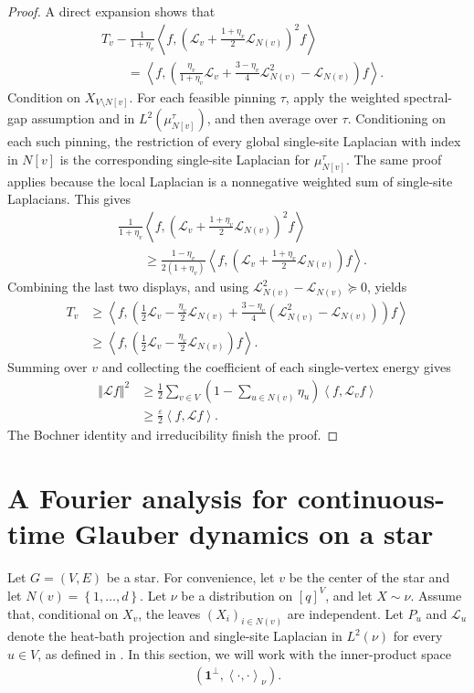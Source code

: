 \documentclass[a4paper,12pt]{article}
\theoremstyle{plain}
\theoremstyle{definition}
\def\*#1{\mathbf{#1}} %
\def\+#1{\mathcal{#1}} %
\def\*#1{\boldsymbol{#1}} %
\def\+#1{\mathcal{#1}} %
\renewcommand{\epsilon}{\varepsilon}
\newcommand{\norm}[1]{\left\Vert#1\right\Vert}
\newcommand{\set}[1]{\left\{#1\right\}}
\newcommand{\inner}[2]{\left\langle #1,#2\right\rangle}
\begin{document}
\begin{proof}
A direct expansion shows that
\begin{align*}
  &T_v-\frac1{1+\eta_v}
  \inner{f}{\left(\+L_v+\frac{1+\eta_v}{2}\+L_{N(v)}\right)^2f}\\
  &\qquad=\inner{f}{\left(
    \frac{\eta_v}{1+\eta_v}\+L_v
    +\frac{3-\eta_v}{4}\+L_{N(v)}^2
    -\+L_{N(v)}
  \right)f}.
\end{align*}
Condition on $X_{V\setminus N[v]}$.  For each feasible pinning $\tau$, apply
the weighted spectral-gap assumption and  in
$L^2(\mu_{N[v]}^\tau)$, and then average over $\tau$.  Conditioning on each such pinning,
the restriction of every global single-site Laplacian with index in $N[v]$
is the corresponding single-site Laplacian for $\mu_{N[v]}^\tau$.  The
same proof applies because the local Laplacian is a nonnegative weighted
sum of single-site Laplacians.  This gives
\begin{align*}
  &\frac1{1+\eta_v}
  \inner{f}{\left(\+L_v+\frac{1+\eta_v}{2}\+L_{N(v)}\right)^2f}\\
  &\qquad\geq\frac{1-\eta_v}{2(1+\eta_v)}
  \inner{f}{\left(\+L_v+\frac{1+\eta_v}{2}\+L_{N(v)}\right)f}.
\end{align*}
Combining the last two displays, and using
$\+L_{N(v)}^2-\+L_{N(v)}\succeq0$, yields
\begin{align*}
  T_v
  &\geq\inner{f}{\left(
    \frac12\+L_v-\frac{\eta_v}{2}\+L_{N(v)}
    +\frac{3-\eta_v}{4}
      (\+L_{N(v)}^2-\+L_{N(v)})
  \right)f}\\
  &\geq\inner{f}{\left(
    \frac12\+L_v-\frac{\eta_v}{2}\+L_{N(v)}
  \right)f}.
\end{align*}
Summing over $v$ and collecting the coefficient of each single-vertex
energy gives
\begin{align*}
  \norm{\+Lf}^2
  &\geq\frac12\sum_{v\in V}
    \left(1-\sum_{u\in N(v)}\eta_u\right)
    \inner{f}{\+L_vf}\\
  &\geq\frac\epsilon2\inner{f}{\+Lf}.
\end{align*}
The Bochner identity and irreducibility finish the proof.
\end{proof}

\section{A Fourier analysis for continuous-time Glauber dynamics on a star} \label{sec:fourier-analysis-on-star}
Let $G = (V, E)$ be a star.
For convenience, let $v$ be the center of the star and let
$N(v)=\set{1,\dots,d}$.
Let $\nu$ be a distribution on $[q]^V$, and let $X\sim\nu$.  Assume that,
conditional on $X_v$, the leaves $(X_i)_{i\in N(v)}$ are independent.
Let $P_u$ and $\+L_u$ denote the heat-bath projection
and single-site Laplacian in $L^2(\nu)$ for every $u\in V$, as defined in
.
In this section, we will work 
with the inner-product space
\begin{align*}
  (\*1^\perp, \inner{\cdot}{\cdot}_\nu).
\end{align*}
\end{document}
